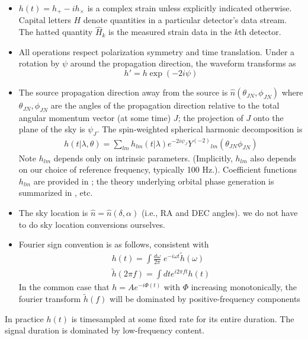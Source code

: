\documentclass[twocolumn,prd,nofootinbib]{revtex4}
\newcommand\Y[1]{Y^{(#1)}{}}
\begin{document}
\begin{shaded}
\begin{itemize}
\item $h(t)=h_+-i h_\times$ is a complex strain unless explicitly indicated otherwise.   Capital letters $H$ denote
  quantities in a particular detector's data stream.  The hatted quantity $\hat{H}_k$ is the measured strain data in the
  $k$th detector.
\item All operations respect polarization symmetry and time translation.  Under a rotation by $\psi$ around the
  propagation direction, the waveform transforms as
\[
h' = h \exp(-2i \psi)
\]
\item The source propagation direction away from the source is $\hat{n}(\theta_{JN},\phi_{JN})$ where
  $\theta_{JN},\phi_{JN}$ are the angles of the propagation direction relative to the total angular momentum vector (at
  some time) $J$; the projection of $J$
  onto the plane of the sky is $\psi_J$.  The spin-weighted
  spherical harmonic decomposition is 
\begin{eqnarray}
\label{eq:def:hSpinWeightEmissionDirection}
h(t|\lambda,\theta) = \sum_{lm} h_{lm}(t|\lambda) e^{-2i\psi_J}\Y{-2}_{lm}(\theta_{JN}\phi_{JN})
\end{eqnarray}
Note $h_{lm}$ depends only on intrinsic parameters.  (Implicitly, $h_{lm}$ also depends on our choice of reference
frequency, typically 100 Hz.).  Coefficient functions $h_{lm}$ are provided in
\cite{gw-astro-mergers-approximations-SpinningPNHigherHarmonics}; the theory underlying orbital phase generation is
summarized in  \cite{gw-astro-PN-Comparison-AlessandraSathya2009}, etc.
\item The sky location is $\hat{n}=\hat{n}(\delta,\alpha)$ (i.e., RA and DEC angles).  we do not have to do sky location
  conversions ourselves.
\item Fourier sign convention is as follows, consistent with \cite{gwastro-mergers-nr-Alignment-ROS-Polarization}
\begin{eqnarray}
h(t) = \int \frac{d \omega}{2\pi} \; e^{-i\omega t} \tilde{h}(\omega) \\
\tilde{h}(2\pi f) = \int dt e^{i 2\pi f t} h(t)
\end{eqnarray}
In the common case that  $h = Ae^{-i\Phi(t)}$ with $\Phi$ increasing monotonically, the fourier transform $\tilde{h}(f)$ will be dominated by
positive-frequency components
\end{itemize}
In practice $h(t)$ is timesampled at some fixed rate for its entire duration.  The signal duration is dominated by
low-frequency content.
\end{shaded}
\end{document}
